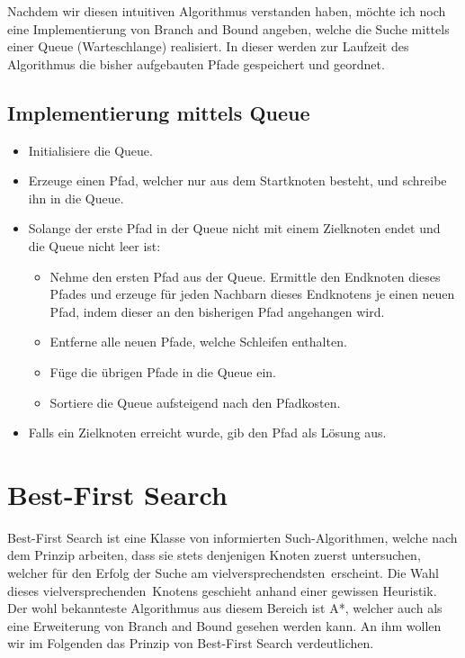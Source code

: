Nachdem wir diesen intuitiven Algorithmus verstanden haben, möchte ich noch eine Implementierung von Branch and Bound angeben, welche die Suche mittels einer Queue (Warteschlange) realisiert. In dieser werden zur Laufzeit des Algorithmus die bisher aufgebauten Pfade gespeichert und geordnet.

\subsection{Implementierung mittels Queue}

\begin{itemize}
	\item Initialisiere die Queue.
	\item Erzeuge einen Pfad, welcher nur aus dem Startknoten besteht, und schreibe ihn in die Queue.
	\item Solange der erste Pfad in der Queue nicht mit einem Zielknoten endet und die Queue nicht leer ist:
	\begin{itemize}
		\item Nehme den ersten Pfad aus der Queue. Ermittle den Endknoten dieses Pfades und erzeuge für jeden Nachbarn dieses Endknotens je einen neuen Pfad, indem dieser an den bisherigen Pfad angehangen wird.
		\item Entferne alle neuen Pfade, welche Schleifen enthalten.
		\item Füge die übrigen Pfade in die Queue ein.
		\item Sortiere die Queue aufsteigend nach den Pfadkosten.
	\end{itemize}
	\item Falls ein Zielknoten erreicht wurde, gib den Pfad als Lösung aus.
\end{itemize}

\section{Best-First Search} \label{BFS}

Best-First Search ist eine Klasse von informierten Such-Algorithmen, welche nach dem Prinzip arbeiten, dass sie stets denjenigen Knoten zuerst untersuchen, welcher für den Erfolg der Suche am \glqq vielversprechendsten\grqq\ erscheint. Die Wahl dieses \glqq vielversprechenden\grqq\ Knotens geschieht anhand einer gewissen Heuristik.
Der wohl bekannteste Algorithmus aus diesem Bereich ist A*, welcher auch als eine Erweiterung von Branch and Bound gesehen werden kann. An ihm wollen wir im Folgenden das Prinzip von Best-First Search verdeutlichen.

